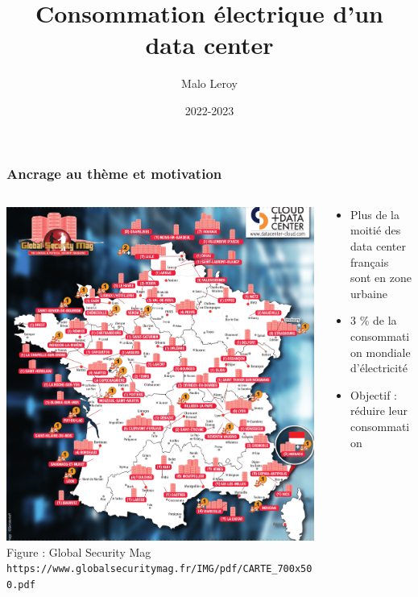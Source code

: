 \documentclass[a4paper,11pt]{beamer}
\title{Consommation électrique d'un data center}
\author{Malo Leroy}
\institute{Candidat n° 21802}
\date{2022-2023}
\newcommand{\p}{\texttt} %
\begin{document}

\maketitle %


\begin{frame}
    \frametitle{Ancrage au thème et motivation}

    \begin{columns}
        \begin{column}{0.5\textwidth}
            \includegraphics[width=\textwidth]{carte_data_center.png}
            \scriptsize{Figure : Global Security Mag \p{https://www.globalsecuritymag.fr/IMG/pdf/CARTE\_700x500.pdf}}
        \end{column}
        \begin{column}{0.5\textwidth}
            \begin{itemize}
                \item Plus de la moitié des data center français sont en zone urbaine
                \item 3 \% de la consommation mondiale d'électricité
                \item Objectif : réduire leur consommation
            \end{itemize}
        \end{column}
    \end{columns}
\end{frame}
\end{document}
